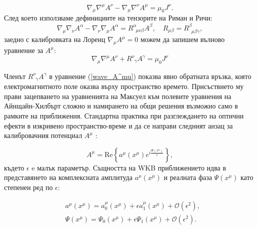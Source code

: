 \begin{equation}
	\nabla_\mu \nabla^\mu A^\nu - \nabla_\mu \nabla^\nu A^\mu = \mu_0 J^\nu.
\end{equation}
След което използваме дефинициите на тензорите на Риман и Ричи:
\begin{equation}
	\nabla_\mu \nabla_\nu A^\alpha - \nabla_\nu \nabla_\mu A^\alpha = R^\alpha_{\,\,\,\mu\nu\beta} A^\beta, \quad R_{\mu\beta} = R^\beta_{\,\,\,\mu\beta\gamma},
\end{equation} 
заедно с калибровката на Лоренц $\nabla_{\mu} A^\mu = 0$ можем да запишем вълново уравнение за $A^\mu$:
\begin{equation}\label{wave_A^mu}
	\nabla_{\mu}\nabla^\mu A^\nu + R^\nu_{\,\,\,\gamma} A^\gamma = \mu_0 J^\nu
\end{equation}

Членът $R^\nu_{\,\,\,\gamma} A^\gamma$ в уравнение (\ref{wave_A^mu}) показва явно обратната връзка, която електромагнитното поле оказва върху пространство времето. Присъствието му прави зацепването на уравненията на Максуел към полевите уравнения на Айнщайн-Хилбърт сложно и намирането на общи решения възможно само в рамките на приближения. Стандартна практика при разглеждането на оптични ефекти в изкривено пространство-време и да се направи следният анзац за калибровачния потенциал $A^\mu$ \cite{Oancea2020}\cite{Misner1973}:

\begin{equation}\label{A^mu_anzatz}
	A^\mu = \text{Re}\left\{a^\mu(x^\mu)e^{i\frac{\Psi(x^\mu)}{\epsilon}}\right\},
\end{equation}
където $\epsilon$ e малък параметър. Същността на WKB приближението идва в представянето на комплексната амплитуда $a^\mu(x^\mu)$ и реалната фаза $\Psi(x^\mu)$ като степенен ред по $\epsilon$:

\begin{subequations}
	\begin{align}
		&a^\mu(x^\mu) = a_0^\mu(x^\mu) + \epsilon a_1^\mu(x^\mu) + \mathcal{O}(\epsilon^2),\\
		&\Psi(x^\mu) = \Psi_0(x^\mu) + \epsilon \Psi_1(x^\mu) + \mathcal{O}(\epsilon^2).
	\end{align}
\end{subequations}


